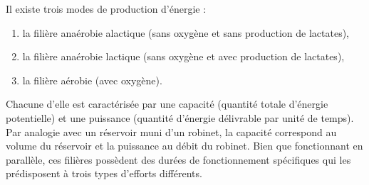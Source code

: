        Il existe trois modes de production d'énergie : 
        \begin{enumerate}
            \item la filière anaérobie alactique (sans oxygène et sans production de lactates),
            \item la filière anaérobie lactique (sans oxygène et avec production de lactates),
            \item la filière aérobie (avec oxygène).\\
        \end{enumerate}
        
        Chacune d’elle est caractérisée par une capacité (quantité totale d'énergie potentielle) et une puissance (quantité d'énergie délivrable par unité de temps). Par analogie avec un réservoir muni d'un robinet, la capacité correspond au volume du réservoir et la puissance au débit du robinet. 
        Bien que fonctionnant en parallèle, ces filières possèdent des durées de fonctionnement spécifiques qui les prédisposent à trois types d'efforts différents.\\
        
